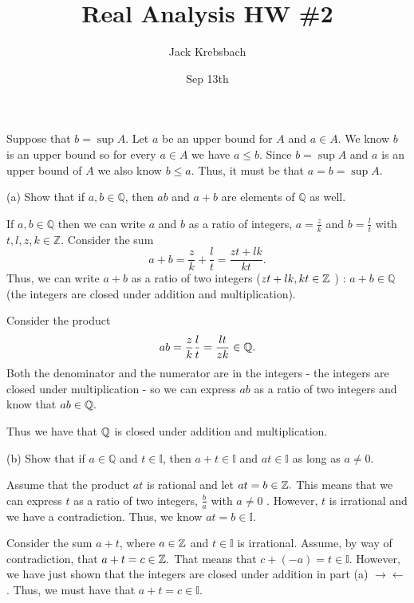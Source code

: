 \documentclass{report}
\title{Real Analysis HW \#2}
\author{Jack Krebsbach }
\date{Sep 13th}
\begin{document}
\maketitle


\begin{myproof}
Suppose that $b = \sup A$. Let $a$ be an upper bound for $A$ and $a \in A$. We know $b$ is an upper bound so for every $a \in A$ we have $a \leq b.$ Since $b = \sup A$ and $a$ is an upper bound of $A$ we also know $b \leq a$. Thus, it must be that $a = b = \sup A.$
\end{myproof}


(a) Show that if $a, b \in \mathbb{Q}$, then $a b$ and $a+b$ are elements of $\mathbb{Q}$ as well.

\sol 
If  $a, b \in \mathbb{Q}$ then we can write $a$ and $b$ as a ratio of integers, $a = \frac{z}{k}$ and $b= \frac{l}{t}$ with $t,l,z,k \in \mathbb{Z}.$ Consider the sum $$
a+b = \frac{z}{k} + \frac{l}{t}= \frac{zt + lk}{kt}. 
$$
Thus, we can write $a+b$ as a ratio of two integers ($zt+lk,kt \in \ZZ$ ) : $a+b \in \mathbb{Q}$ (the integers are closed under addition and multiplication). 
\par \bigskip

Consider the product
$$ab = \frac{z}{k} \frac{l}{t} = \frac{lt}{zk} \in \QQ.$$ Both the denominator and the numerator are in the integers - the integers are closed under multiplication - so we can express $ab$ as a ratio of two integers and know that $ab \in \QQ.$
\par 
Thus we have that $\QQ$ is  closed under addition and multiplication.
\par 
\bigskip
(b) Show that if $a \in \mathbb{Q}$ and $t \in \mathbb{I}$, then $a+t \in \mathbb{I}$ and $a t \in \mathbb{I}$ as long as $a \neq 0$.

\sol 

Assume that the product $at$ is rational and let $ at = b \in \ZZ.$ This means that we can express $t$ as a ratio of two integers, $\frac{b}{a}$ with $a \neq 0$ . However, $t$ is irrational and we have a contradiction. Thus, we know $at =b  \in \mathbb{I}.$
\par
Consider the sum $a + t $, where $a \in \ZZ$ and $t\in \mathbb{I}$  is irrational. Assume, by way of contradiction, that $ a + t = c \in \ZZ.$ That means that $c  + (-a) = t \in \mathbb{I}.$ However, we have just shown that the integers are closed under addition in part (a)
$\rightarrow\!\leftarrow$. Thus, we must have that $a+t = c \in \mathbb{I}.$
\end{document}
